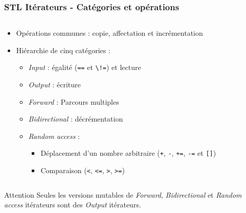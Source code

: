 \documentclass[C++.tex]{subfiles}
\begin{document}
\begin{frame}
	\frametitle{STL Itérateurs - Catégories et opérations}
	\begin{columns}[T]
		\begin{column}{0.80\textwidth}
			\begin{itemize}
				\item Opérations communes : copie, affectation et incrémentation
				\item Hiérarchie de cinq catégories :
				\begin{itemize}
					\item \textit{Input} : égalité (\lstinline|==| et \lstinline|\!=|) et lecture
					\item \textit{Output} : écriture
					\item \textit{Forward} : Parcours multiples


					\item \textit{Bidirectional} : décrémentation
					\item \textit{Random access} : 
					\begin{itemize}
						\item Déplacement d'un nombre arbitraire (\lstinline|+|, \lstinline|-|, \lstinline|+=|, \lstinline|-=| et \lstinline|[]|)
						\item Comparaison (\lstinline|<|, \lstinline|<=|, \lstinline|>|, \lstinline|>=|)
					\end{itemize} 
				\end{itemize}
			\end{itemize}
		\end{column}

		\begin{column}{0.20\textwidth}
			\centering
		\end{column}
	\end{columns}

	\begin{alertblock}{Attention}
		Seules les versions mutables de \textit{Forward}, \textit{Bidirectional} et \textit{Random access} itérateurs sont des \textit{Output} itérateurs.
	\end{alertblock}
\end{frame}
\end{document}
